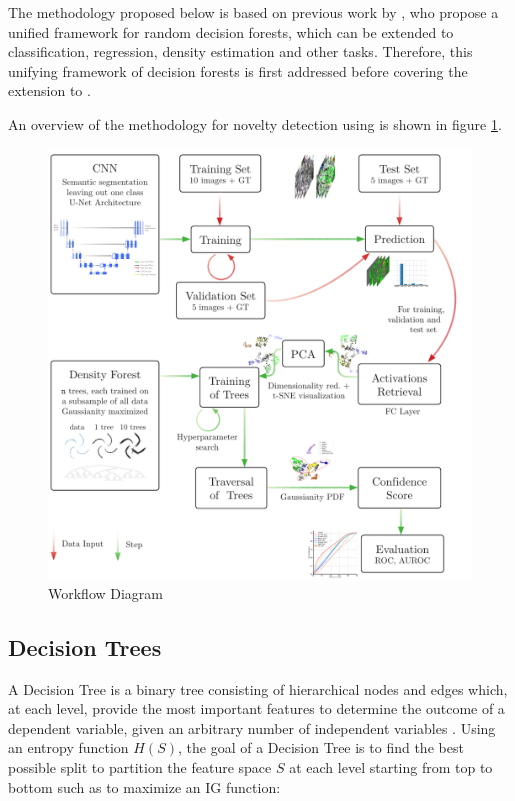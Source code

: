 \documentclass[10pt]{article}
\begin{document}
The methodology proposed below is based on previous work by \textcite{decisionForests-MSR}, who propose a unified framework for random decision forests, which can be extended to classification, regression, density estimation and other tasks. Therefore, this unifying framework of decision forests is first addressed before covering the extension to .

An overview of the methodology for novelty detection using  is shown in figure \ref{fig:schema}.

\begin{figure}[H]
    \centering
    \includegraphics[width=\textwidth]{Schema/schema_df}
    \caption{Workflow Diagram}
    \label{fig:schema}
\end{figure}

\subsection{Decision Trees}
A Decision Tree is a binary tree consisting of hierarchical nodes and edges which, at each level, provide the most important features to determine the outcome of a dependent variable, given an arbitrary number of independent variables \cite{decisionForests-MSR}. Using an entropy function $H(S)$, the goal of a Decision Tree is to find the best possible split to partition the feature space $S$ at each level starting from top to bottom such as to maximize an \acrlong{IG} function:
\end{document}
